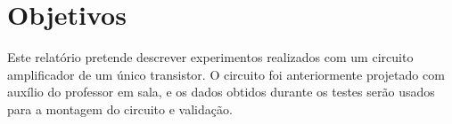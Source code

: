 \section{Objetivos}
\label{sec:objetivos}

    \indent Este relatório pretende descrever experimentos realizados com um circuito amplificador de um único transistor. O circuito foi anteriormente projetado com auxílio do professor em sala, e os dados obtidos durante os testes serão usados para a montagem do circuito e validação.


